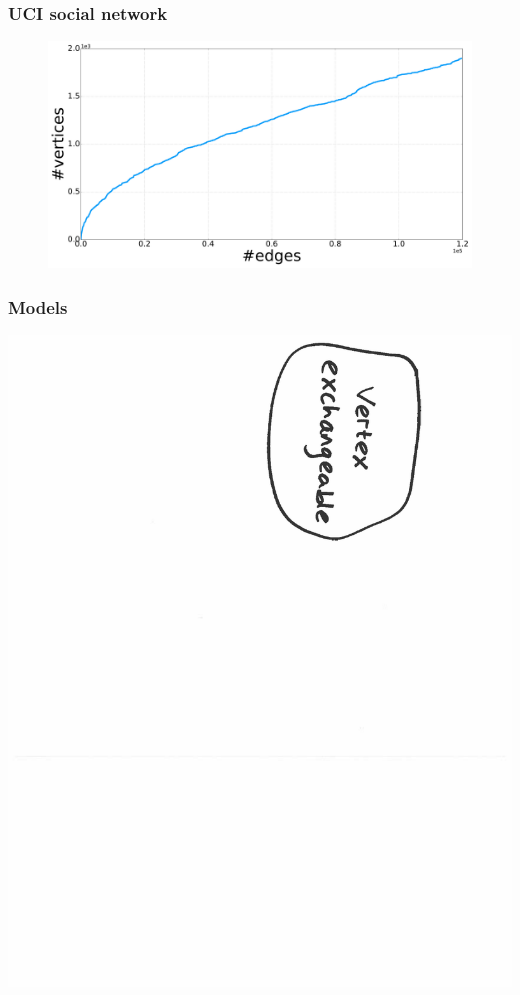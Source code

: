 \documentclass[final,hyperref={pdfpagelabels=false},noamsthm]{beamer}
\begin{document}
\begin{frame}
	\frametitle{UCI social network}
	\begin{figure}[h]
		\includegraphics[width=1.0\textwidth]{fig/n_CollegeMsg_arrival.pdf}
	\end{figure}
\end{frame}

%	
%	


\begin{frame}
	\frametitle{Models}
	\includegraphics[angle=90,origin=c,scale=0.4]{fig/models1}
\end{frame}
\end{document}
